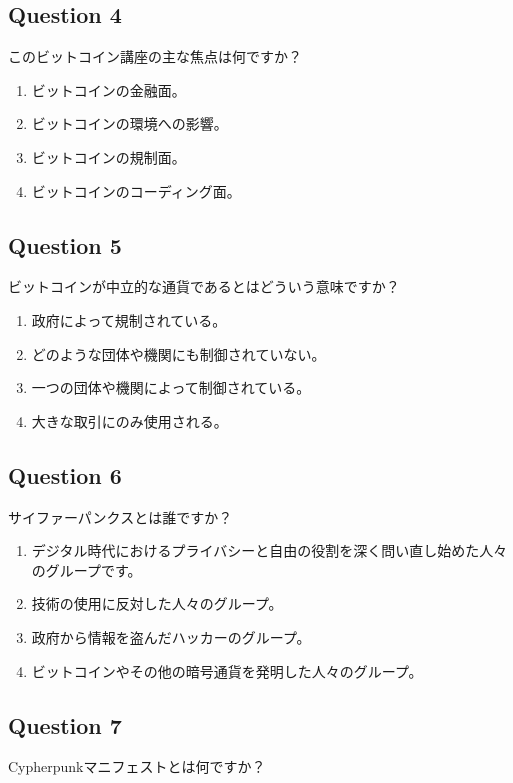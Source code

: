 \documentclass[12pt,a4paper]{article}
\begin{document}
\bigskip


\subsection*{Question 4}
このビットコイン講座の主な焦点は何ですか？

\begin{enumerate}[label=\Alph*., leftmargin=*]
\item ビットコインの金融面。
\item ビットコインの環境への影響。
\item ビットコインの規制面。
\item ビットコインのコーディング面。
\end{enumerate}

\bigskip


\subsection*{Question 5}
ビットコインが中立的な通貨であるとはどういう意味ですか？

\begin{enumerate}[label=\Alph*., leftmargin=*]
\item 政府によって規制されている。
\item どのような団体や機関にも制御されていない。
\item 一つの団体や機関によって制御されている。
\item 大きな取引にのみ使用される。
\end{enumerate}

\bigskip


\subsection*{Question 6}
サイファーパンクスとは誰ですか？

\begin{enumerate}[label=\Alph*., leftmargin=*]
\item デジタル時代におけるプライバシーと自由の役割を深く問い直し始めた人々のグループです。
\item 技術の使用に反対した人々のグループ。
\item 政府から情報を盗んだハッカーのグループ。
\item ビットコインやその他の暗号通貨を発明した人々のグループ。
\end{enumerate}

\bigskip


\subsection*{Question 7}
Cypherpunkマニフェストとは何ですか？
\end{document}
